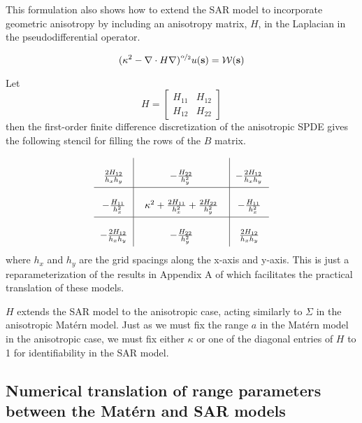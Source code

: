 \documentclass[review]{elsarticle}
\begin{document}
This formulation also shows how to extend the SAR model to incorporate geometric anisotropy by including an anisotropy matrix, $H$, in the Laplacian in the pseudodifferential operator.

$$ (\kappa^2 - \nabla \cdot H \nabla)^{\nicefrac{\alpha}{2}} u(\mathbf s) = \mathcal{W}(\mathbf s) $$  

Let 
\[ H = \begin{bmatrix} H_{11} & H_{12} \\
                        H_{12} & H_{22}
        \end{bmatrix} \]
then the first-order finite difference discretization of the anisotropic SPDE gives the following stencil for filling the rows of the $B$ matrix.

\begin{equation}
\label{e:3}
       \arraycolsep=6.0pt\def\arraystretch{2.5}
   \begin{array}{c|c|c}
      \frac{2H_{12}}{h_x h_y} & -\frac{H_{22}}{h_y^2} & -\frac{2H_{12}}{h_x h_y} \\
        \hline
      -\frac{H_{11}}{h_x^2} & \;\; \kappa^2 + \frac{2H_{11}}{h_x^2} + \frac{2H_{22}}{h_y^2} \;\; & -\frac{H_{11}}{h_x^2} \\
      \hline
      -\frac{2H_{12}}{h_x h_y} & -\frac{H_{22}}{h_y^2} & \frac{2H_{12}}{h_x h_y} \\
    \end{array} 
\end{equation}
where $h_x$ and $h_y$ are the grid spacings along the x-axis and y-axis. This is just a reparameterization of the results in Appendix A of \cite{lindgren2011explicit} which facilitates the practical translation of these models.

$H$ extends the SAR model to the anisotropic case, acting similarly to $\Sigma$ in the anisotropic Mat\'ern model. Just as we must fix the range $a$ in the Mat\'ern model in the anisotropic case, we must fix either $\kappa$ or one of the diagonal entries of $H$ to 1 for identifiability in the SAR model.










\subsection{Numerical translation of range parameters between the Mat\'ern and SAR models}
\label{ss:1}
\end{document}
